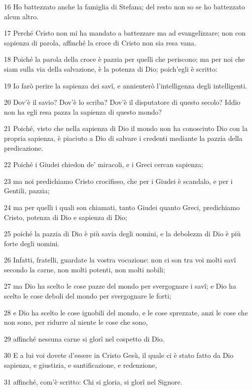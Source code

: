 \par 16 Ho battezzato anche la famiglia di Stefana; del resto non so se ho battezzato alcun altro.
\par 17 Perché Cristo non mi ha mandato a battezzare ma ad evangelizzare; non con sapienza di parola, affinché la croce di Cristo non sia resa vana.
\par 18 Poiché la parola della croce è pazzia per quelli che periscono; ma per noi che siam sulla via della salvazione, è la potenza di Dio; poich'egli è scritto:
\par 19 Io farò perire la sapienza dei savî, e annienterò l'intelligenza degli intelligenti.
\par 20 Dov'è il savio? Dov'è lo scriba? Dov'è il disputatore di questo secolo? Iddio non ha egli resa pazza la sapienza di questo mondo?
\par 21 Poiché, visto che nella sapienza di Dio il mondo non ha conosciuto Dio con la propria sapienza, è piaciuto a Dio di salvare i credenti mediante la pazzia della predicazione.
\par 22 Poiché i Giudei chiedon de' miracoli, e i Greci cercan sapienza;
\par 23 ma noi predichiamo Cristo crocifisso, che per i Giudei è scandalo, e per i Gentili, pazzia;
\par 24 ma per quelli i quali son chiamati, tanto Giudei quanto Greci, predichiamo Cristo, potenza di Dio e sapienza di Dio;
\par 25 poiché la pazzia di Dio è più savia degli uomini, e la debolezza di Dio è più forte degli uomini.
\par 26 Infatti, fratelli, guardate la vostra vocazione: non ci son tra voi molti savî secondo la carne, non molti potenti, non molti nobili;
\par 27 ma Dio ha scelto le cose pazze del mondo per svergognare i savî; e Dio ha scelto le cose deboli del mondo per svergognare le forti;
\par 28 e Dio ha scelto le cose ignobili del mondo, e le cose sprezzate, anzi le cose che non sono, per ridurre al niente le cose che sono,
\par 29 affinché nessuna carne si glorî nel cospetto di Dio.
\par 30 E a lui voi dovete d'essere in Cristo Gesù, il quale ci è stato fatto da Dio sapienza, e giustizia, e santificazione, e redenzione,
\par 31 affinché, com'è scritto: Chi si gloria, si glorî nel Signore.

